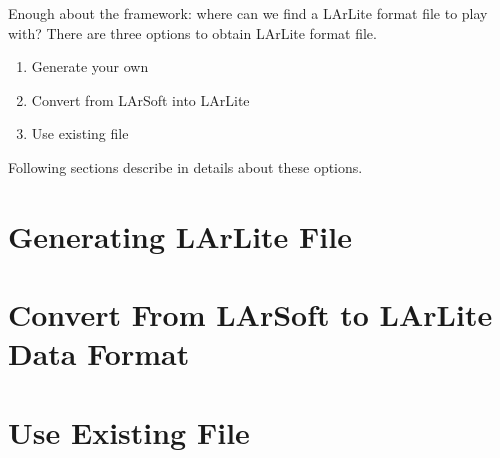 Enough about the framework: where can we find a LArLite format \ROOT file to play with?
There are three options to obtain LArLite format \ROOT file.
\begin{enumerate}
\item Generate your own
\item Convert from LArSoft into LArLite
\item Use existing file
\end{enumerate}
Following sections describe in details about these options.

\section{Generating LArLite File}
\label{sec:datafile:generate}


\section{Convert From LArSoft to LArLite Data Format}
\label{sec:datafile:convert}


\section{Use Existing File}
\label{sec:datafile::existing}


